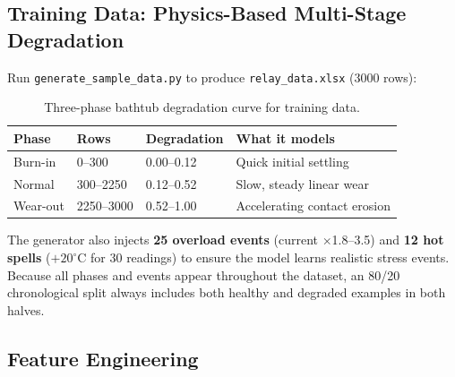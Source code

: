 \documentclass[12pt,a4paper]{article}
\begin{document}
\subsection{Training Data: Physics-Based Multi-Stage Degradation}

Run \texttt{generate\_sample\_data.py} to produce \texttt{relay\_data.xlsx} (3000 rows):

\begin{table}[H]
\centering
\begin{tabular}{llll}
\toprule
\textbf{Phase} & \textbf{Rows} & \textbf{Degradation} & \textbf{What it models} \\
\midrule
Burn-in   & 0--300   & 0.00--0.12 & Quick initial settling \\
Normal    & 300--2250 & 0.12--0.52 & Slow, steady linear wear \\
Wear-out  & 2250--3000 & 0.52--1.00 & Accelerating contact erosion \\
\bottomrule
\end{tabular}
\caption{Three-phase bathtub degradation curve for training data.}
\end{table}

The generator also injects \textbf{25 overload events} (current $\times$1.8--3.5) and
\textbf{12 hot spells} ($+20^\circ$C for 30 readings) to ensure the model learns realistic stress events.
Because all phases and events appear throughout the dataset, an 80/20 chronological split always includes
both healthy and degraded examples in both halves.

\subsection{Feature Engineering}
\end{document}
